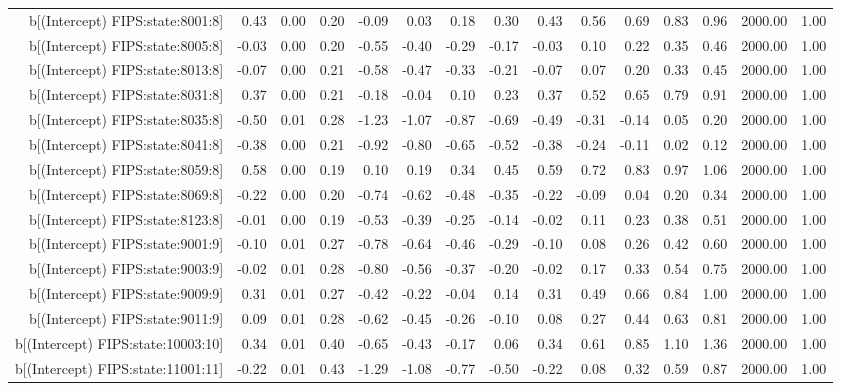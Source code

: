 \begin{table}[ht]
\begin{tabular}{rrrrrrrrrrrrrrr}
  b[(Intercept) FIPS:state:8001:8] & 0.43 & 0.00 & 0.20 & -0.09 & 0.03 & 0.18 & 0.30 & 0.43 & 0.56 & 0.69 & 0.83 & 0.96 & 2000.00 & 1.00 \\ 
  b[(Intercept) FIPS:state:8005:8] & -0.03 & 0.00 & 0.20 & -0.55 & -0.40 & -0.29 & -0.17 & -0.03 & 0.10 & 0.22 & 0.35 & 0.46 & 2000.00 & 1.00 \\ 
  b[(Intercept) FIPS:state:8013:8] & -0.07 & 0.00 & 0.21 & -0.58 & -0.47 & -0.33 & -0.21 & -0.07 & 0.07 & 0.20 & 0.33 & 0.45 & 2000.00 & 1.00 \\ 
  b[(Intercept) FIPS:state:8031:8] & 0.37 & 0.00 & 0.21 & -0.18 & -0.04 & 0.10 & 0.23 & 0.37 & 0.52 & 0.65 & 0.79 & 0.91 & 2000.00 & 1.00 \\ 
  b[(Intercept) FIPS:state:8035:8] & -0.50 & 0.01 & 0.28 & -1.23 & -1.07 & -0.87 & -0.69 & -0.49 & -0.31 & -0.14 & 0.05 & 0.20 & 2000.00 & 1.00 \\ 
  b[(Intercept) FIPS:state:8041:8] & -0.38 & 0.00 & 0.21 & -0.92 & -0.80 & -0.65 & -0.52 & -0.38 & -0.24 & -0.11 & 0.02 & 0.12 & 2000.00 & 1.00 \\ 
  b[(Intercept) FIPS:state:8059:8] & 0.58 & 0.00 & 0.19 & 0.10 & 0.19 & 0.34 & 0.45 & 0.59 & 0.72 & 0.83 & 0.97 & 1.06 & 2000.00 & 1.00 \\ 
  b[(Intercept) FIPS:state:8069:8] & -0.22 & 0.00 & 0.20 & -0.74 & -0.62 & -0.48 & -0.35 & -0.22 & -0.09 & 0.04 & 0.20 & 0.34 & 2000.00 & 1.00 \\ 
  b[(Intercept) FIPS:state:8123:8] & -0.01 & 0.00 & 0.19 & -0.53 & -0.39 & -0.25 & -0.14 & -0.02 & 0.11 & 0.23 & 0.38 & 0.51 & 2000.00 & 1.00 \\ 
  b[(Intercept) FIPS:state:9001:9] & -0.10 & 0.01 & 0.27 & -0.78 & -0.64 & -0.46 & -0.29 & -0.10 & 0.08 & 0.26 & 0.42 & 0.60 & 2000.00 & 1.00 \\ 
  b[(Intercept) FIPS:state:9003:9] & -0.02 & 0.01 & 0.28 & -0.80 & -0.56 & -0.37 & -0.20 & -0.02 & 0.17 & 0.33 & 0.54 & 0.75 & 2000.00 & 1.00 \\ 
  b[(Intercept) FIPS:state:9009:9] & 0.31 & 0.01 & 0.27 & -0.42 & -0.22 & -0.04 & 0.14 & 0.31 & 0.49 & 0.66 & 0.84 & 1.00 & 2000.00 & 1.00 \\ 
  b[(Intercept) FIPS:state:9011:9] & 0.09 & 0.01 & 0.28 & -0.62 & -0.45 & -0.26 & -0.10 & 0.08 & 0.27 & 0.44 & 0.63 & 0.81 & 2000.00 & 1.00 \\ 
  b[(Intercept) FIPS:state:10003:10] & 0.34 & 0.01 & 0.40 & -0.65 & -0.43 & -0.17 & 0.06 & 0.34 & 0.61 & 0.85 & 1.10 & 1.36 & 2000.00 & 1.00 \\ 
  b[(Intercept) FIPS:state:11001:11] & -0.22 & 0.01 & 0.43 & -1.29 & -1.08 & -0.77 & -0.50 & -0.22 & 0.08 & 0.32 & 0.59 & 0.87 & 2000.00 & 1.00 \\ 

\end{tabular}
\end{table}
